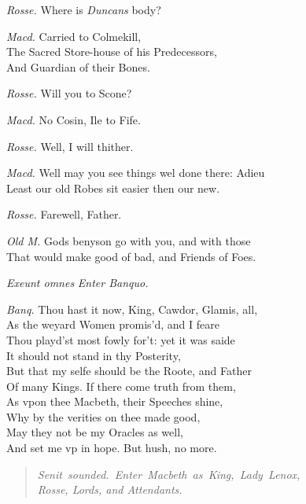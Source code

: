 \documentclass[12pt]{sides}
\newcommand{\StageDir}[1]{\begin{quote}\centering\em #1\end{quote}}
\newcommand{\clStageDir}[1]{\hspace*{\fill}\textit{#1}\hspace*{\fill}}
\newcommand{\elStageDir}[1]{\hfill\textit{#1}}
\newcommand{\dia}[1]{\hskip 15pt\textit{#1}\hskip 6pt}
\begin{document}
\begin{multicols}{2}
            \dia{Rosse.} Where is \textit{Duncans} body?

            \dia{Macd.} Carried to Colmekill, \\ The Sacred Store-house of his Predecessors, \\ And Guardian of their Bones.

            \dia{Rosse.} Will you to Scone?

            \dia{Macd.} No Cosin, Ile to Fife.

            \dia{Rosse.} Well, I will thither.

            \dia{Macd.} Well may you see things wel done there: Adieu \\ Least our old Robes sit easier then our new.

            \dia{Rosse.} Farewell, Father.

            \dia{Old M.} Gods benyson go with you, and with those \\ That would make good of bad, and Friends of Foes.

            \elStageDir{Exeunt omnes}
            \clStageDir{Enter Banquo.}

            \dia{Banq.} Thou hast it now, King, Cawdor, Glamis, all, \\ As the weyard Women promis'd, and I feare \\ Thou playd'st most fowly for't: yet it was saide \\ It should not stand in thy Posterity, \\ But that my selfe should be the Roote, and Father \\ Of many Kings. If there come truth from them, \\ As vpon thee Macbeth, their Speeches shine, \\ Why by the verities on thee made good, \\ May they not be my Oracles as well, \\ And set me vp in hope. But hush, no more.

            \StageDir{\mbox{Senit sounded. Enter Macbeth as King, Lady Lenox,} \\Rosse, Lords, and Attendants.} %

	\end{multicols}
\end{document}
